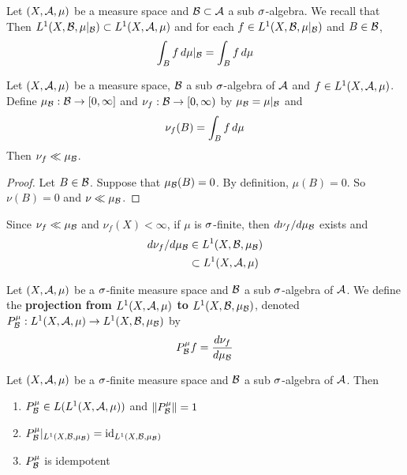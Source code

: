 \documentclass{book}
\begin{document}
	\begin{note}
		Let $(X, \mathcal{A}, \mu)$ be a measure space and $\mathcal{B} \subset \mathcal{A}$ a sub $\sigma$-algebra. We recall  that  Then $ L^1(X, \mathcal{B}, \mu|_{\mathcal{B}}) \subset L^1(X, \mathcal{A}, \mu)$ and for each $f \in L^1(X, \mathcal{B}, \mu|_{\mathcal{B}})$ and $B \in \mathcal{B}$, 
		$$\int_B f \, d \mu|_{\mathcal{B}} = \int_B f \, d \mu$$
	\end{note}
	
	\begin{ex}
		Let $(X, \mathcal{A}, \mu)$ be a measure space, $\mathcal{B}$ a sub $\sigma$-algebra of $\mathcal{A}$ and $f \in L^1(X, \mathcal{A}, \mu)$. Define $\mu_{\mathcal{B}}: \mathcal{B} \rightarrow [0, \infty] $ and $\nu_f: \mathcal{B} \rightarrow [0,\infty)$ by $\mu_{\mathcal{B}} = \mu|_{\mathcal{B}}$ and 
		$$\nu_f(B) = \int_B f \, d \mu $$ 
		Then $\nu_f \ll \mu_{\mathcal{B}}$. 
	\end{ex}	
	
	\begin{proof}
		Let $B \in \mathcal{B}$. Suppose that $\mu_{\mathcal{B}}(B) = 0$. By definition, $\mu(B) = 0$. So $\nu(B) = 0$ and $\nu \ll \mu_{\mathcal{B}}$.
	\end{proof}
	
	\begin{note}
		Since $\nu_f \ll \mu_{\mathcal{B}}$ and $\nu_f(X) < \infty$, if $\mu$ is $\sigma$-finite, then $d \nu_{f} / d \mu_{\mathcal{B}}$ exists and 
		\begin{align*}
			d \nu_{f} / d \mu_{\mathcal{B}} 
			& \in L^1(X, \mathcal{B}, \mu_{\mathcal{B}}) \\
			& \subset L^1(X, \mathcal{A}, \mu)
		\end{align*}
	\end{note}
	
	\begin{defn}
		Let $(X, \mathcal{A}, \mu)$ be a $\sigma$-finite measure space and $\mathcal{B}$ a sub $\sigma$-algebra of $\mathcal{A}$. We define the \textbf{projection from $L^1(X, \mathcal{A}, \mu)$ to $L^1(X, \mathcal{B}, \mu_{\mathcal{B}})$}, denoted $P^{\mu}_{\mathcal{B}}:L^1(X, \mathcal{A}, \mu) \rightarrow L^1(X, \mathcal{B}, \mu_{\mathcal{B}})$ by 
		$$P^{\mu}_{\mathcal{B}}f = \frac{d \nu_f}{d \mu_{\mathcal{B}}}$$ 
	\end{defn}
	
	\begin{ex}
		Let $(X, \mathcal{A}, \mu)$ be a $\sigma$-finite measure space and $\mathcal{B}$ a sub $\sigma$-algebra of $\mathcal{A}$. Then 
		\begin{enumerate}
			\item $P^{\mu}_{\mathcal{B}} \in L(L^1(X, \mathcal{A}, \mu))$ and $\|P^{\mu}_{\mathcal{B}}\| = 1$
			\item $P^{\mu}_{\mathcal{B}}|_{L^1(X, \mathcal{B}, \mu_{\mathcal{B}})} = \operatorname{id}_{L^1(X, \mathcal{B}, \mu_{\mathcal{B}})}$ 
			\item $P^{\mu}_{\mathcal{B}}$ is idempotent
		\end{enumerate}
	\end{ex}
	
\end{document}
